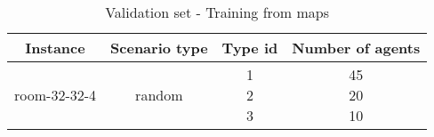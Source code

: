 \begin{table}[!ht]
    \centering
    \caption{Validation set - Training from maps}
    \begin{tabular}{|c|c|c|c|}
        \hline
        Instance & Scenario type & Type id & Number of agents \\
        \hline
        room-32-32-4 & random & \makecell{1 \\ 2 \\ 3} & \makecell{45 \\ 20 \\ 10} \\
        \hline
    \end{tabular}
    \label{tab:val-set-map}
\end{table}